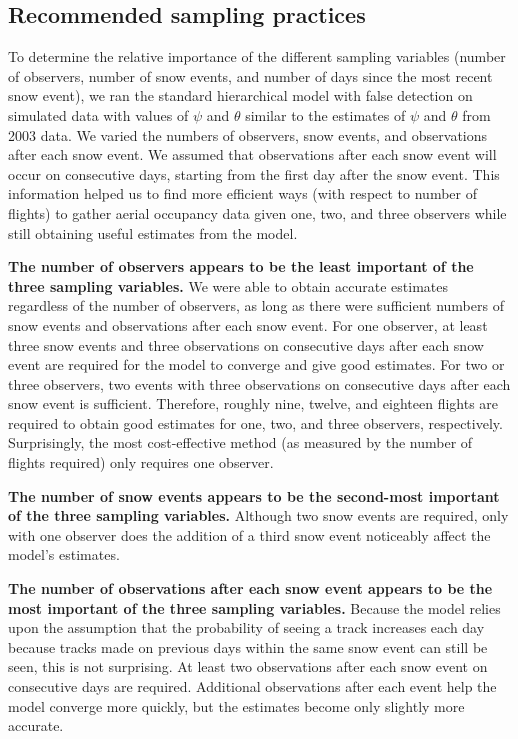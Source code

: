\documentclass[12pt]{article}
\begin{document}
    \subsection{Recommended sampling practices}
    To determine the relative importance of the different sampling variables
    (number of observers, number of snow events, and
    number of days since the most recent snow event), we ran the standard
    hierarchical model with false detection on simulated data with values of
    \(\psi\) and
    \(\theta\) similar to the estimates of \(\psi\) and \(\theta\) from 2003
    data. We varied the numbers of observers, snow events, and observations
    after
    each snow event. We assumed that observations after each snow event will
    occur on consecutive days, starting from the first day after the snow event.
    This information helped us to find more efficient ways (with respect to
    number of flights) to gather aerial occupancy data given one, two, and three
    observers while still obtaining useful estimates from the model.

    \textbf{The number of observers appears to be the least important of the
    three
    sampling variables.} We were able to obtain accurate estimates regardless of
    the
    number of observers, as long as there were sufficient numbers of snow events
    and observations after each snow event. For one observer, at least three
    snow events and three observations on consecutive days after each snow event
    are required for the model to converge and give good estimates. For two or
    three observers, two events with three observations on consecutive days
    after each snow event is sufficient. Therefore, roughly nine, twelve, and
    eighteen flights are required to obtain good estimates for one, two, and
    three observers, respectively. Surprisingly, the most cost-effective method
    (as measured by the number of flights required) only requires one observer.

    \textbf{The number of snow events appears to be the second-most important of
    the
    three sampling variables.} Although two snow events are required, only with
    one
    observer does the addition of a third snow event noticeably affect the
    model's estimates.

    \textbf{The number of observations after each snow event appears to be the
    most
    important of the three sampling variables.} Because the model relies upon
    the
    assumption that the probability of seeing a track increases each day because
    tracks made on previous days within the same snow event can still be seen,
    this is not surprising. At least two observations after each snow event on
    consecutive days are required. Additional observations after each event help
    the model converge more quickly, but the estimates become only slightly more
    accurate.
\end{document}
